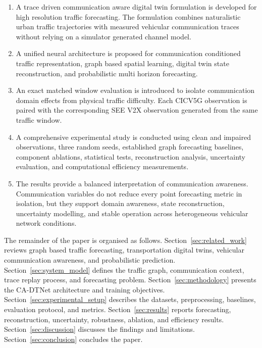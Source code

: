 \documentclass[pdflatex,sn-mathphys-num]{sn-jnl}%
\theoremstyle{thmstyleone}%
\theoremstyle{thmstyletwo}%
\theoremstyle{thmstylethree}%
\begin{document}
\begin{enumerate}
    \item A trace driven communication aware digital twin formulation is developed for high resolution traffic forecasting. The formulation combines naturalistic urban traffic trajectories with measured vehicular communication traces without relying on a simulator generated channel model.

    \item A unified neural architecture is proposed for communication conditioned traffic representation, graph based spatial learning, digital twin state reconstruction, and probabilistic multi horizon forecasting.

    \item An exact matched window evaluation is introduced to isolate communication domain effects from physical traffic difficulty. Each CICV5G observation is paired with the corresponding SEE V2X observation generated from the same traffic window.

    \item A comprehensive experimental study is conducted using clean and impaired observations, three random seeds, established graph forecasting baselines, component ablations, statistical tests, reconstruction analysis, uncertainty evaluation, and computational efficiency measurements.

    \item The results provide a balanced interpretation of communication awareness. Communication variables do not reduce every point forecasting metric in isolation, but they support domain awareness, state reconstruction, uncertainty modelling, and stable operation across heterogeneous vehicular network conditions.
\end{enumerate}

The remainder of the paper is organised as follows. Section~\ref{sec:related_work} reviews graph based traffic forecasting, transportation digital twins, vehicular communication awareness, and probabilistic prediction. Section~\ref{sec:system_model} defines the traffic graph, communication context, trace replay process, and forecasting problem. Section~\ref{sec:methodology} presents the CA-DTNet architecture and training objectives. Section~\ref{sec:experimental_setup} describes the datasets, preprocessing, baselines, evaluation protocol, and metrics. Section~\ref{sec:results} reports forecasting, reconstruction, uncertainty, robustness, ablation, and efficiency results. Section~\ref{sec:discussion} discusses the findings and limitations. Section~\ref{sec:conclusion} concludes the paper.
\end{document}
